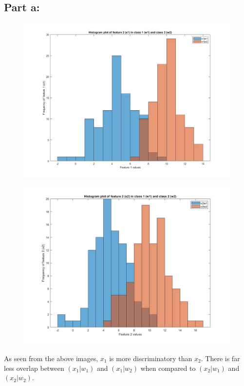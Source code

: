\documentclass[a4paper,12pt]{article}
\begin{document}
\subsection*{Part a:}
\begin{figure}[H]
\centering
\includegraphics[scale=0.26]{q6pa_1.jpg}
\end{figure}
\pagebreak
\begin{figure}[H]
\centering
\includegraphics[scale=0.26]{q6pa_2.jpg}
\end{figure}

As seen from the above images, $x_1$ is more discriminatory than $x_2$. There is far less overlap between $(x_1|w_1)$ and $(x_1|w_2)$ when compared to $(x_2|w_1)$ and $(x_2|w_2)$.
\end{document}

